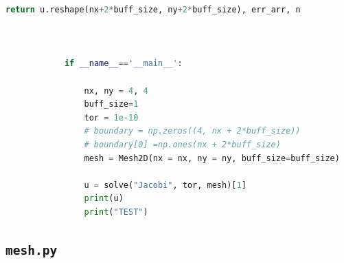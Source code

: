 \documentclass[12pt]{article}
\begin{document}
\begin{lstlisting}[language={Python}]
                return u.reshape(nx+2*buff_size, ny+2*buff_size), err_arr, n
            
            
            
            if __name__=='__main__':
            
                nx, ny = 4, 4
                buff_size=1
                tor = 1e-10
                # boundary = np.zeros((4, nx + 2*buff_size))
                # boundary[0] =np.ones(nx + 2*buff_size)
                mesh = Mesh2D(nx = nx, ny = ny, buff_size=buff_size)
            
                u = solve("Jacobi", tor, mesh)[1]
                print(u)
                print("TEST")
        \end{lstlisting}

    \subsection{\texttt{mesh.py}}
\end{document}
